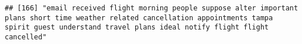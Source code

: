 \documentclass[
]{article}
\begin{document}
\begin{verbatim}
## [166] "email received flight morning people suppose alter important plans short time weather related cancellation appointments tampa spirit guest understand travel plans ideal notify flight flight cancelled"                                                                                                                                                                                                                                                                                                                                                                                                                                                                                                                                                                                                                                                                                                                                                                                                                                                                                                                                                                                                                                                                                                                                                                                                                                                                                                                                                                                                                                                                                                                                                                                       

\end{verbatim}
\end{document}
